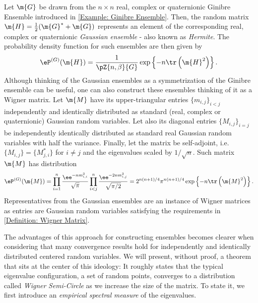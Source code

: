 \begin{exemplo}	\label{Example: Gaussian construction}
	Let $\m{G}$ be drawn from the $n \times n$ real, complex or quaternionic Ginibre Ensemble introduced in \autoref{Example: Ginibre Ensemble}. Then, the random matrix $\m{H} = \frac{1}{2} (\m{G}^{*} + \m{G})$ represents an element of the corresponding real, complex or quaternionic \textit{Gaussian ensemble} - also known as \textit{Hermite}. The probability density function for such ensembles are then given by
	\begin{equation}
		\eP^{(G)}(\m{H}) = \frac{1}{\pZ{n, \beta}{G}} \exp\left\{- n \tr\left( \m{H}^2 \right)\right\}.
	\end{equation}
	Although thinking of the Gaussian ensembles as a symmetrization of the Ginibre ensemble can be useful, one can also construct these ensembles thinking of it as a Wigner matrix. Let $\m{M}$ have its upper-triangular entries $\{m_{i,j}\}_{i<j}$ independently and identically distributed as standard (real, complex or quaternionic) Gaussian random variables. Let also its diagonal entries $\{M_{i,j}\}_{i=j}$ be independently identically distributed as standard real Gaussian random variables with half the variance. Finally, let the matrix be self-adjoint, i.e. $\{M_{i,j}\} = \{M_{j,i}^*\}$ for $i \neq j$ and the eigenvalues scaled by $1/\sqrt{n}$. Such matrix $\m{M}$ has distribution
	\begin{equation}
		\eP^{(G)}(\m{M}) = \prod_{i=1}^{n}\frac{\ee^{-n m_{i,i}^2}}{\sqrt{\pi}} \prod_{i<j}^{n} \frac{\ee^{-2n m_{i,j}^2}}{\sqrt{\pi/2}} = 2^{n(n + 1)/4} \pi^{n(n + 1)/4} \exp\left\{- n \tr\left( \m{M}^2 \right)\right\}.
	\end{equation}
	Representatives from the Gaussian ensembles are an instance of Wigner matrices as entries are Gaussian random variables satisfying the requirements in \autoref{Definition: Wigner Matrix}.
 \end{exemplo}

The advantages of this approach for constructing ensembles becomes clearer when considering that many convergence results hold for independently and identically distributed centered random variables. We will present, without proof, a theorem that sits at the center of this ideology: It roughly states that the typical eigenvalue configuration, a set of random points, converges to a distribution called \textit{Wigner Semi-Circle} as we increase the size of the matrix. To state it, we first introduce an \textit{empirical spectral measure} of the eigenvalues. 

